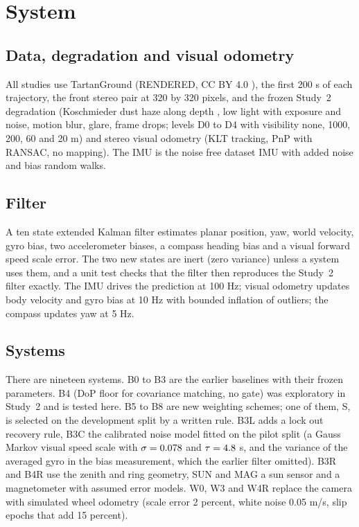 \section{System}
\label{sec:system}
\subsection{Data, degradation and visual odometry}
All studies use TartanGround \cite{tartanground} (RENDERED, CC BY 4.0 \cite{tg_hf}), the first 200 s of each trajectory, the front stereo pair at 320 by 320 pixels, and the frozen Study~2 degradation (Koschmieder dust haze along depth \cite{cheng}, low light with exposure and noise, motion blur, glare, frame drops; levels D0 to D4 with visibility none, 1000, 200, 60 and 20 m) and stereo visual odometry (KLT tracking, PnP with RANSAC, no mapping). The IMU is the noise free dataset IMU with added noise and bias random walks.


\subsection{Filter}
A ten state extended Kalman filter estimates planar position, yaw, world velocity, gyro bias, two accelerometer biases, a compass heading bias and a visual forward speed scale error. The two new states are inert (zero variance) unless a system uses them, and a unit test checks that the filter then reproduces the Study~2 filter exactly. The IMU drives the prediction at 100 Hz; visual odometry updates body velocity and gyro bias at 10 Hz with bounded inflation of outliers; the compass updates yaw at 5 Hz.

\subsection{Systems}
There are nineteen systems. B0 to B3 are the earlier baselines with their frozen parameters. B4 (DoP floor for covariance matching, no gate) was exploratory in Study~2 and is tested here. B5 to B8 are new weighting schemes; one of them, S, is selected on the development split by a written rule. B3L adds a lock out recovery rule, B3C the calibrated noise model fitted on the pilot split (a Gauss Markov visual speed scale with $\sigma = 0.078{}$ and $\tau = 4.8{}$ s, and the variance of the averaged gyro in the bias measurement, which the earlier filter omitted). B3R and B4R use the zenith and ring geometry, SUN and MAG a sun sensor and a magnetometer with assumed error models. W0, W3 and W4R replace the camera with simulated wheel odometry (scale error 2 percent, white noise 0.05 m/s, slip epochs that add 15 percent).


